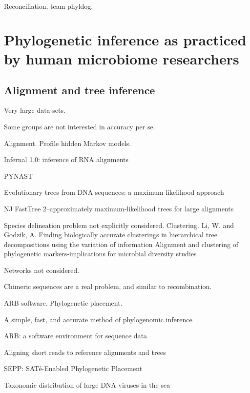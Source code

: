 \documentclass{amsart}
\begin{document}
Reconciliation, team phyldog.


\section{Phylogenetic inference as practiced by human microbiome researchers}

\subsection{Alignment and tree inference}

Very large data sets.

Some groups are not interested in accuracy per se.

Alignment.
\cite{eddy1998profile}
Profile hidden Markov models.

\cite{nawrocki2009infernal}
Infernal 1.0: inference of RNA alignments

PYNAST


\cite{felsenstein1981evolutionary}
{Evolutionary trees from DNA sequences: a maximum likelihood approach}

NJ
\cite{price2010fasttree}
{FastTree 2--approximately maximum-likelihood trees for large alignments}

Species delineation problem not explicitly considered. Clustering.
\cite{li2006cdhit}
Li, W.  and Godzik, A.
\cite{edgar2010usearch}
\cite{navlakha2009finding} Finding biologically accurate clusterings in hierarchical tree decompositions using the variation of information
\cite{white2010alignment} Alignment and clustering of phylogenetic markers-implications for microbial diversity studies

Networks not considered.

Chimeric sequences are a real problem, and similar to recombination.

ARB software.
Phylogenetic placement.

\cite{wu2008simple}
A simple, fast, and accurate method of phylogenomic inference

\cite{matsen2010pplacer}

\cite{ludwig2004arb}
{{ARB}: a software environment for sequence data}
\cite{berger2011performance}

\cite{berger2011aligning}
Aligning short reads to reference alignments and trees

\cite{mirarabsepp}
{SEPP: SAT{\'e}-Enabled Phylogenetic Placement}

\cite{monierEaLargeViruses08}
{Taxonomic distribution of large DNA viruses in the sea}
\end{document}
